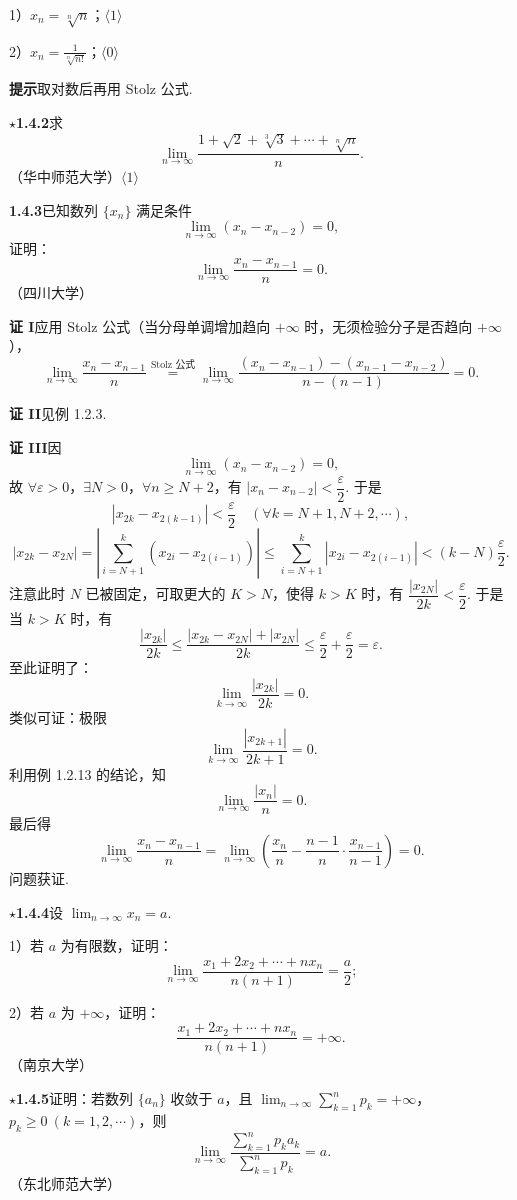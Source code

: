 \documentclass[UTF8, 12pt, fontset=fandol, oneside]{ctexart}
\begin{document}
1）$x_n=\sqrt[n]{n}$；\quad $\langle1\rangle$

2）$\displaystyle x_n=\frac1{\sqrt[n]{n!}}$；\quad $\langle0\rangle$

\noindent\textbf{提示}\quad 取对数后再用 Stolz 公式.

\noindent\textbf{$\star$1.4.2}\quad 求
\[
  \lim_{n\to\infty}\frac{1+\sqrt2+\sqrt[3]3+\cdots+\sqrt[n]n}{n}.
\]
（华中师范大学）\quad $\langle1\rangle$

\noindent\textbf{1.4.3}\quad 已知数列 $\{x_n\}$ 满足条件
\[
  \lim_{n\to\infty}(x_n-x_{n-2})=0,
\]
证明：
\[
  \lim_{n\to\infty}\frac{x_n-x_{n-1}}n=0.
\]
（四川大学）

\noindent\textbf{证 I}\quad 应用 Stolz 公式（当分母单调增加趋向 $+\infty$ 时，无须检验分子是否趋向 $+\infty$），
\[
  \lim_{n\to\infty}\frac{x_n-x_{n-1}}n
  \overset{\text{Stolz 公式}}{=}
  \lim_{n\to\infty}\frac{(x_n-x_{n-1})-(x_{n-1}-x_{n-2})}{n-(n-1)}
  =0.
\]

\noindent\textbf{证 II}\quad 见例 1.2.3.

\noindent\textbf{证 III}\quad 因
\[
  \lim_{n\to\infty}(x_n-x_{n-2})=0,
\]
故 $\forall\varepsilon>0$，$\exists N>0$，$\forall n\ge N+2$，有
$|x_n-x_{n-2}|<\dfrac\varepsilon2$. 于是
\[
  |x_{2k}-x_{2(k-1)}|<\frac\varepsilon2
  \quad(\forall k=N+1,N+2,\cdots),
\]
\[
  |x_{2k}-x_{2N}|
  =\left|\sum_{i=N+1}^k(x_{2i}-x_{2(i-1)})\right|
  \le\sum_{i=N+1}^k|x_{2i}-x_{2(i-1)}|
  <(k-N)\frac\varepsilon2.
\]
注意此时 $N$ 已被固定，可取更大的 $K>N$，使得 $k>K$ 时，有
$\dfrac{|x_{2N}|}{2k}<\dfrac\varepsilon2$. 于是当 $k>K$ 时，有
\[
  \frac{|x_{2k}|}{2k}
  \le\frac{|x_{2k}-x_{2N}|+|x_{2N}|}{2k}
  \le\frac\varepsilon2+\frac\varepsilon2=\varepsilon.
\]
至此证明了：
\[
  \lim_{k\to\infty}\frac{|x_{2k}|}{2k}=0.
\]
类似可证：极限
\[
  \lim_{k\to\infty}\frac{|x_{2k+1}|}{2k+1}=0.
\]
利用例 1.2.13 的结论，知
\[
  \lim_{n\to\infty}\frac{|x_n|}{n}=0.
\]
最后得
\[
  \lim_{n\to\infty}\frac{x_n-x_{n-1}}n
  =\lim_{n\to\infty}\left(\frac{x_n}{n}-\frac{n-1}{n}\cdot\frac{x_{n-1}}{n-1}\right)=0.
\]
问题获证.

\noindent\textbf{$\star$1.4.4}\quad 设 $\displaystyle\lim_{n\to\infty}x_n=a$.

1）若 $a$ 为有限数，证明：
\[
  \lim_{n\to\infty}\frac{x_1+2x_2+\cdots+nx_n}{n(n+1)}=\frac a2;
\]

2）若 $a$ 为 $+\infty$，证明：
\[
  \frac{x_1+2x_2+\cdots+nx_n}{n(n+1)}=+\infty.
\]
（南京大学）

\noindent\textbf{$\star$1.4.5}\quad 证明：若数列 $\{a_n\}$ 收敛于 $a$，且
$\displaystyle\lim_{n\to\infty}\sum_{k=1}^n p_k=+\infty$，$p_k\ge0\ (k=1,2,\cdots)$，则
\[
  \lim_{n\to\infty}
  \frac{\displaystyle\sum_{k=1}^n p_ka_k}
  {\displaystyle\sum_{k=1}^n p_k}=a.
\]
（东北师范大学）
\end{document}
